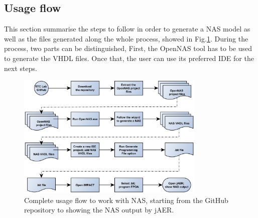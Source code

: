 

\subsection{Usage flow}

This section summarise the steps to follow in order to generate a NAS model as well as the files generated along the whole process, showed in Fig.\ref{fig:nas_designflow}. During the process, two parts can be distinguished, First, the OpenNAS tool has to be used to generate the VHDL files. Once that, the user can use its preferred IDE for the next steps.



\begin{figure}[H]
\centering
\includegraphics[width=0.8\textwidth]{NAS_design_flow.jpg}
\caption{\label{fig:nas_designflow}Complete usage flow to work with NAS, starting from the GitHub repository to showing the NAS output by jAER.}
\end{figure}

